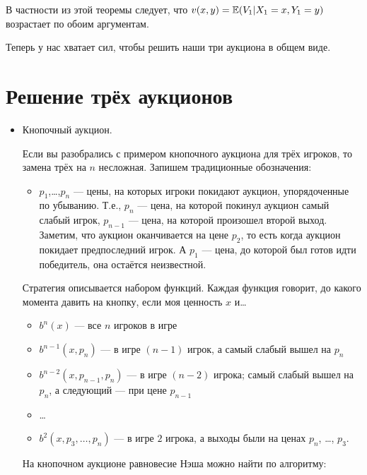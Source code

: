 В частности из этой теоремы следует, что $ v(x,y)=\mathbb{E}(V_{1}|X_{1}=x,Y_{1}=y) $ возрастает по обоим аргументам.


Теперь у нас хватает сил, чтобы решить наши три аукциона в общем виде.

\section{Решение трёх аукционов}

\begin{itemize}
\item Кнопочный аукцион.

Если вы разобрались с примером кнопочного аукциона для трёх игроков, то замена трёх на $ n $ несложная. Запишем традиционные обозначения:

\begin{itemize}
\item $ p_{1} $,\ldots,$ p_{n} $ — цены, на которых игроки покидают аукцион, упорядоченные по убыванию. Т.е., $ p_{n} $ — цена, на которой покинул аукцион самый слабый игрок, $ p_{n-1} $ — цена, на которой произошел второй выход. Заметим, что аукцион оканчивается на цене $ p_{2} $, то есть когда аукцион покидает предпоследний игрок. А $ p_{1} $ — цена, до которой был готов идти победитель, она остаётся неизвестной.
\end{itemize}


Стратегия описывается набором функций. Каждая функция говорит, до какого момента давить на кнопку, если моя ценность $ x $ и\ldots
\begin{itemize}
\item $ b^{n}(x) $ — все $ n $ игроков в игре
\item $ b^{n-1}(x,p_{n}) $ — в игре $ (n-1) $ игрок, а самый слабый вышел на $ p_{n} $
\item $ b^{n-2}(x,p_{n-1},p_{n}) $ —  в игре $ (n-2) $ игрока; самый слабый вышел на $ p_{n} $, а следующий — при цене $ p_{n-1} $
\item \ldots
\item $ b^{2}(x,p_{3},\ldots,p_{n}) $ — в игре $ 2 $ игрока, а выходы были на ценах $p_{n}$, \ldots, $ p_{3} $.
\end{itemize}

На кнопочном аукционе равновесие Нэша можно найти по алгоритму:


\end{itemize}
